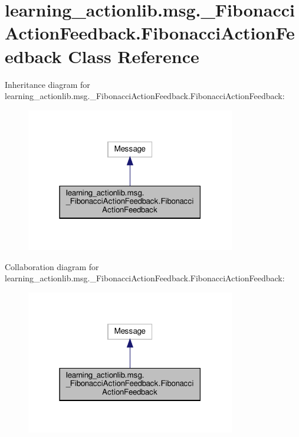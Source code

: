 \hypertarget{classlearning__actionlib_1_1msg_1_1__FibonacciActionFeedback_1_1FibonacciActionFeedback}{}\section{learning\+\_\+actionlib.\+msg.\+\_\+\+Fibonacci\+Action\+Feedback.\+Fibonacci\+Action\+Feedback Class Reference}
\label{classlearning__actionlib_1_1msg_1_1__FibonacciActionFeedback_1_1FibonacciActionFeedback}


Inheritance diagram for learning\+\_\+actionlib.\+msg.\+\_\+\+Fibonacci\+Action\+Feedback.\+Fibonacci\+Action\+Feedback\+:
\nopagebreak
\begin{figure}[H]
\begin{center}
\leavevmode
\includegraphics[width=259pt]{classlearning__actionlib_1_1msg_1_1__FibonacciActionFeedback_1_1FibonacciActionFeedback__inherit__graph}
\end{center}
\end{figure}


Collaboration diagram for learning\+\_\+actionlib.\+msg.\+\_\+\+Fibonacci\+Action\+Feedback.\+Fibonacci\+Action\+Feedback\+:
\nopagebreak
\begin{figure}[H]
\begin{center}
\leavevmode
\includegraphics[width=259pt]{classlearning__actionlib_1_1msg_1_1__FibonacciActionFeedback_1_1FibonacciActionFeedback__coll__graph}
\end{center}
\end{figure}
